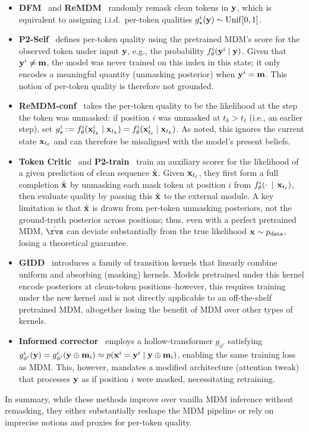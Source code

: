 \begin{itemize}[leftmargin=*,itemsep=0pt]
\item \textbf{DFM}~\citep{gat2024discrete} and \textbf{ReMDM}~\citep{wang2025remasking} randomly remask clean tokens in ${\mathbf{y}}$, which is equivalent to assigning i.i.d.\ per-token qualities $g_\star^i({\mathbf{y}})\sim \operatorname{Unif}[0,1]$.
\item \textbf{P2-Self}~\citep{peng2025pathplanningmaskeddiffusion} defines per-token quality using the pretrained MDM’s score for the observed token under input ${\mathbf{y}}$, e.g., the probability $f_\theta^i({\mathbf{y}}^i \mid {\mathbf{y}})$. Given that ${\mathbf{y}}^i\neq\mathbf{m}$, the model was never trained on this index in this state; it only encodes a meaningful quantity (unmasking posterior) when ${\mathbf{y}}^i=\mathbf{m}$. This notion of per-token quality is therefore not grounded.
\item \textbf{ReMDM-conf}~\citep{wang2025remasking} takes the per-token quality to be the likelihood at the step the token was unmasked: if position $i$ was unmasked at $t_k>t_\ell$ (i.e., an earlier step), set $g_\star^i := f_\theta^i({\mathbf{x}}_{t_k}^i \mid {\mathbf{x}}_{t_k})=f_\theta^i({\mathbf{x}}_{t_\ell}^i \mid {\mathbf{x}}_{t_k})$. As noted, this ignores the current state ${\mathbf{x}}_{t_\ell}$ and can therefore be misaligned with the model’s present beliefs.
\item \textbf{Token Critic}~\citep{lezama2022improved,lezama2022discrete} and \textbf{P2-train}~\citep{peng2025pathplanningmaskeddiffusion} train an auxiliary scorer for the likelihood of a given prediction of clean sequence $\hat{{\mathbf{x}}}$. Given ${\mathbf{x}}_{t_\ell}$, they first form a full completion $\hat{{\mathbf{x}}}$ by unmasking each mask token at position $i$ from $f_\theta^i(\cdot\,\mid\,{\mathbf{x}}_{t_\ell})$, then evaluate quality by passing this $\hat{{\mathbf{x}}}$ to the external module. A key limitation is that $\hat{{\mathbf{x}}}$ is drawn from per-token unmasking posteriors, not the ground-truth posterior across positions; thus, even with a perfect pretrained MDM, $\hat{\rvs}$ can deviate substantially from the true likelihood ${\mathbf{x}}\sim p_{\mathrm{data}}$, losing a theoretical guarantee.
\item \textbf{GIDD}~\citep{von2025generalized} introduces a family of transition kernels that linearly combine uniform and absorbing (masking) kernels. Models pretrained under this kernel encode posteriors at clean-token positions--however, this requires training under the new kernel and is not directly applicable to an off-the-shelf pretrained MDM, altogether losing the benefit of MDM over other types of kernels.
\item \textbf{Informed corrector}~\citep{zhao2024informed} employs a hollow-transformer $g_{\phi'}$ satisfying $g_{\phi'}^i({\mathbf{y}})=g_{\phi'}^i({\mathbf{y}}\oplus \mathbf{m}_i)\approx p({\mathbf{x}}^i={\mathbf{y}}^i\mid {\mathbf{y}}\oplus \mathbf{m}_i)$, enabling the same training loss as MDM. This, however, mandates a modified architecture (attention tweak) that processes ${\mathbf{y}}$ as if position $i$ were masked, necessitating retraining.
\end{itemize}
In summary, while these methods improve over vanilla MDM inference without remasking, they either substantially reshape the MDM pipeline or rely on imprecise notions and proxies for per-token quality.